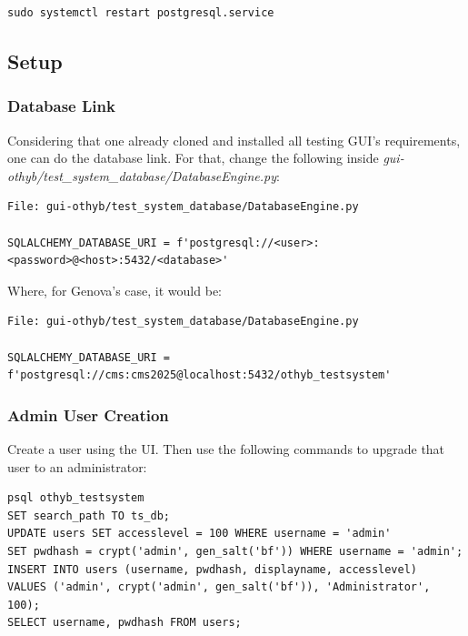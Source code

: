 \documentclass[10pt,a4paper]{article}
\begin{document}
\begin{framed}
\begin{verbatim}
sudo systemctl restart postgresql.service
\end{verbatim}
\end{framed}

\subsection{Setup}

\subsubsection{Database Link}

Considering that one already cloned and installed all testing GUI's requirements, one can do the database link. For that, change the following inside \emph{gui-othyb/test\_system\_database/DatabaseEngine.py}:

\begin{framed}
\begin{verbatim}
File: gui-othyb/test_system_database/DatabaseEngine.py

SQLALCHEMY_DATABASE_URI = f'postgresql://<user>:<password>@<host>:5432/<database>'
\end{verbatim}
\end{framed}

Where, for Genova's case, it would be: 

\begin{framed}
\begin{verbatim}
File: gui-othyb/test_system_database/DatabaseEngine.py

SQLALCHEMY_DATABASE_URI = f'postgresql://cms:cms2025@localhost:5432/othyb_testsystem'
\end{verbatim}
\end{framed}

\subsubsection{Admin User Creation}

Create a user using the UI. Then use the following commands to upgrade that user to an administrator: 

\begin{framed}
\begin{verbatim}
psql othyb_testsystem 
SET search_path TO ts_db; 
UPDATE users SET accesslevel = 100 WHERE username = 'admin'
SET pwdhash = crypt('admin', gen_salt('bf')) WHERE username = 'admin';
INSERT INTO users (username, pwdhash, displayname, accesslevel)
VALUES ('admin', crypt('admin', gen_salt('bf')), 'Administrator', 100);
SELECT username, pwdhash FROM users;
\end{verbatim}
\end{framed}
\end{document}

